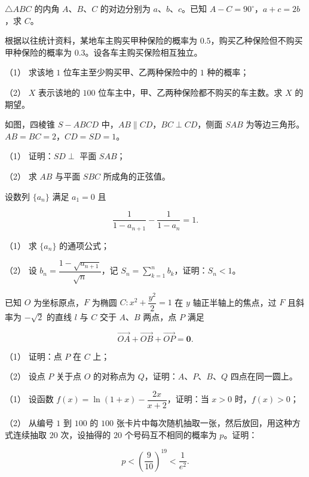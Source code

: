 \begin{question}
$\triangle ABC$ 的内角 $A\text{、}B\text{、}C$ 的对边分别为 $a\text{、}b\text{、}c$。已知 $A-C=90^\circ$，$a+c=2b$，求 $C$。

\end{question}
\begin{question}
根据以往统计资料，某地车主购买甲种保险的概率为 $0.5$，购买乙种保险但不购买甲种保险的概率为 $0.3$。设各车主购买保险相互独立。

（1） 求该地 $1$ 位车主至少购买甲、乙两种保险中的 $1$ 种的概率；

（2） $X$ 表示该地的 $100$ 位车主中，甲、乙两种保险都不购买的车主数。求 $X$ 的期望。

\Needspace{0.4\textheight}
\end{question}
\begin{question}
如图，四棱锥 $S-ABCD$ 中，$AB\parallel CD$，$BC\perp CD$，侧面 $SAB$ 为等边三角形。$AB=BC=2$，$CD=SD=1$。
\nopagebreak[4]
\begin{center}\end{center}
\nopagebreak[4]
（1） 证明：$SD\perp$ 平面 $SAB$；

（2） 求 $AB$ 与平面 $SBC$ 所成角的正弦值。

\end{question}
\begin{question}
设数列 $\{a_n\}$ 满足 $a_1=0$ 且

\nopagebreak[4]
\[
\frac{1}{1-a_{n+1}}-\frac{1}{1-a_n}=1.
\]

（1） 求 $\{a_n\}$ 的通项公式；

（2） 设 $b_n=\dfrac{1-\sqrt{a_{n+1}}}{\sqrt n}$，记 $S_n=\displaystyle\sum_{k=1}^n b_k$，证明：$S_n<1$。

\Needspace{0.4\textheight}
\end{question}
\begin{question}
已知 $O$ 为坐标原点，$F$ 为椭圆 $C:x^2+\dfrac{y^2}{2}=1$ 在 $y$ 轴正半轴上的焦点，过 $F$ 且斜率为 $-\sqrt2$ 的直线 $l$ 与 $C$ 交于 $A\text{、}B$ 两点，点 $P$ 满足

\nopagebreak[4]
\[
\overrightarrow{OA}+\overrightarrow{OB}+\overrightarrow{OP}=\boldsymbol0.
\]
\nopagebreak[4]
\begin{center}\end{center}
\nopagebreak[4]
（1） 证明：点 $P$ 在 $C$ 上；

（2） 设点 $P$ 关于点 $O$ 的对称点为 $Q$，证明：$A\text{、}P\text{、}B\text{、}Q$ 四点在同一圆上。

\end{question}
\begin{question}
（1） 设函数 $f(x)=\ln(1+x)-\dfrac{2x}{x+2}$，证明：当 $x>0$ 时，$f(x)>0$；

（2） 从编号 $1$ 到 $100$ 的 $100$ 张卡片中每次随机抽取一张，然后放回，用这种方式连续抽取 $20$ 次，设抽得的 $20$ 个号码互不相同的概率为 $p$。证明：

\nopagebreak[4]
\[
p<\left(\frac9{10}\right)^{19}<\frac1{e^2}.
\]

\end{question}